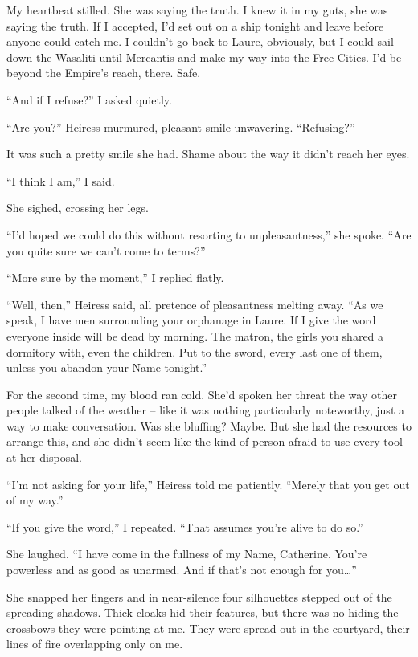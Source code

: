 \documentclass[12pt, openany]{book}
\begin{document}
My heartbeat stilled. She was saying the truth. I knew it in my guts, she was saying the truth. If I accepted, I’d set out on a ship tonight and leave before anyone could catch me. I couldn’t go back to Laure, obviously, but I could sail down the Wasaliti until Mercantis and make my way into the Free Cities. I’d be beyond the Empire’s reach, there. Safe.

“And if I refuse?” I asked quietly.

“Are you?” Heiress murmured, pleasant smile unwavering. “Refusing?”

It was such a pretty smile she had. Shame about the way it didn’t reach her eyes.

“I think I am,” I said.

She sighed, crossing her legs.

“I’d hoped we could do this without resorting to unpleasantness,” she spoke. “Are you quite sure we can’t come to terms?”

“More sure by the moment,” I replied flatly.

“Well, then,” Heiress said, all pretence of pleasantness melting away. “As we speak, I have men surrounding your orphanage in Laure. If I give the word everyone inside will be dead by morning. The matron, the girls you shared a dormitory with, even the children. Put to the sword, every last one of them, unless you abandon your Name tonight.”

For the second time, my blood ran cold. She’d spoken her threat the way other people talked of the weather – like it was nothing particularly noteworthy, just a way to make conversation. Was she bluffing? Maybe. But she had the resources to arrange this, and she didn’t seem like the kind of person afraid to use every tool at her disposal.

“I’m not asking for your life,” Heiress told me patiently. “Merely that you get out of my way.”

“If you give the word,” I repeated. “That assumes you’re alive to do so.”

She laughed. “I have come in the fullness of my Name, Catherine. You’re powerless and as good as unarmed. And if that’s not enough for you…”

She snapped her fingers and in near-silence four silhouettes stepped out of the spreading shadows. Thick cloaks hid their features, but there was no hiding the crossbows they were pointing at me. They were spread out in the courtyard, their lines of fire overlapping only on me.
\end{document}
